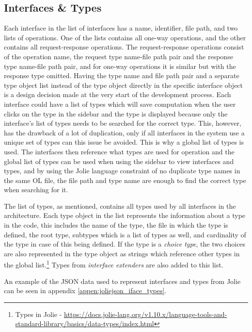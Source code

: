 \subsection{Interfaces \& Types}
Each interface in the list of interfaces has a name, identifier, file path, and two lists of operations.
One of the lists contains all one-way operations, and the other contains all request-response operations.
The request-response operations consist of the operation name, the request type name-file path pair and the response type name-file path pair, and for one-way operations it is similar but with the response type omitted.
Having the type name and file path pair and a separate type object list instead of the type object directly in the specific interface object is a design decision made at the very start of the development process.
Each interface could have a list of types which will save computation when the user clicks on the type in the sidebar and the type is displayed because only the interface's list of types needs to be searched for the correct type.
This, however, has the drawback of a lot of duplication, only if all interfaces in the system use a unique set of types can this issue be avoided.
This is why a global list of types is used. The interfaces then reference what types are used for operation and the global list of types can be used when using the sidebar to view interfaces and types, and by
using the Jolie language constraint of no duplicate type names in the same OL file, the file path and type name are enough to find the correct type when searching for it.

The list of types, as mentioned, contains all types used by all interfaces in the architecture.
Each type object in the list represents the information about a type in the code, this includes the name of the type, the file in which the type is defined, the root type, subtypes which is a list of types as well, and cardinality of the type in case of this being defined.
If the type is a \textit{choice type}, the two choices are also represented in the type object as strings which reference other types in the global list.\footnote{Types in Jolie - \url{https://docs.jolie-lang.org/v1.10.x/language-tools-and-standard-library/basics/data-types/index.html}}
Types from \textit{interface extenders} are also added to this list.

An example of the JSON data used to represent interfaces and types from Jolie can be seen in appendix \ref*{appen:joliejson_iface_types}.

